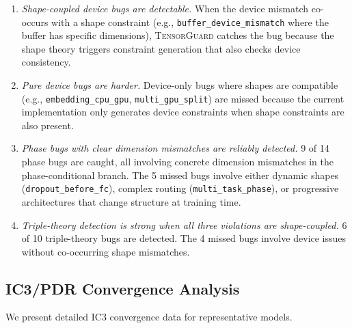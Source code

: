 \documentclass[10pt]{article}
\newcommand{\tguard}{\textsc{TensorGuard}}
\theoremstyle{plain}
\theoremstyle{definition}
\theoremstyle{remark}
\begin{document}
\begin{enumerate}[nosep,leftmargin=1.5em]
  \item \emph{Shape-coupled device bugs are detectable.}  When the
    device mismatch co-occurs with a shape constraint (e.g.,
    \texttt{buffer\_device\_mismatch} where the buffer has specific
    dimensions), \tguard{} catches the bug because the shape theory
    triggers constraint generation that also checks device consistency.

  \item \emph{Pure device bugs are harder.}  Device-only bugs where
    shapes are compatible (e.g., \texttt{embedding\_cpu\_gpu},
    \texttt{multi\_gpu\_split}) are missed because the current
    implementation only generates device constraints when shape
    constraints are also present.

  \item \emph{Phase bugs with clear dimension mismatches are reliably
    detected.}  9 of 14 phase bugs are caught, all involving concrete
    dimension mismatches in the phase-conditional branch.  The 5 missed
    bugs involve either dynamic shapes (\texttt{dropout\_before\_fc}),
    complex routing (\texttt{multi\_task\_phase}), or progressive
    architectures that change structure at training time.

  \item \emph{Triple-theory detection is strong when all three
    violations are shape-coupled.}  6 of 10 triple-theory bugs are
    detected.  The 4 missed bugs involve device issues without
    co-occurring shape mismatches.
\end{enumerate}

\subsection{IC3/PDR Convergence Analysis}\label{sec:ic3-convergence}

We present detailed IC3 convergence data for representative models.
\end{document}
